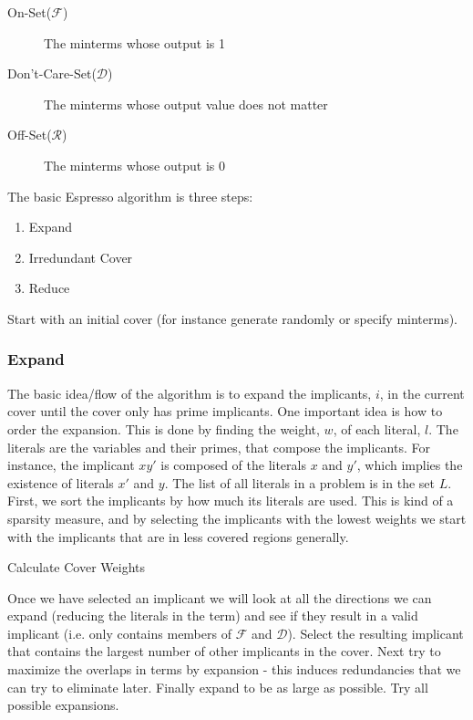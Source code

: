 \begin{description}
\item[On-Set($\mathcal{F}$)] The minterms whose output is 1
\item[Don't-Care-Set($\mathcal{D}$)] The minterms whose output value does not matter
\item[Off-Set($\mathcal{R}$)] The minterms whose output is 0
\end{description}

The basic Espresso algorithm is three steps:
\begin{enumerate}
\item Expand
\item Irredundant Cover
\item Reduce
\end{enumerate}

Start with an initial cover (for instance generate randomly or specify minterms).

\subsubsection{Expand}
The basic idea/flow of the algorithm is to expand the implicants, $i$, in the current cover until the cover only has prime implicants.  One important idea is how to order the expansion.  This is done by finding the weight, $w$, of each literal, $l$.  The literals are the variables and their primes, that compose the implicants.  For instance, the implicant $xy'$ is composed of the literals $x$ and $y'$, which implies the existence of literals $x'$ and $y$.  The list of all literals in a problem is in the set $L$.  First, we sort the implicants by how much its literals are used.  This is kind of a sparsity measure, and by selecting the implicants with the lowest weights we start with the implicants that are in less covered regions generally.

\begin{algorithm}[H]
 \caption{Calculate Cover Weights}
\end{algorithm}

Once we have selected an implicant we will look at all the directions we can expand (reducing the literals in the term) and see if they result in a valid implicant (i.e. only contains members of $\mathcal{F}$ and $\mathcal{D}$).  Select the resulting implicant that contains the largest number of other implicants in the cover.  Next try to maximize the overlaps in terms by expansion - this induces redundancies that we can try to eliminate later.  Finally expand to be as large as possible.  Try all possible expansions.


